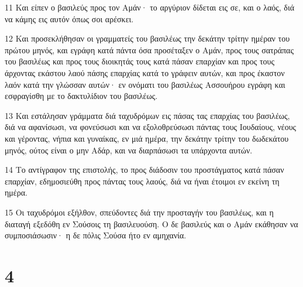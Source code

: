 \par 11 Και είπεν ο βασιλεύς προς τον Αμάν· το αργύριον δίδεται εις σε, και ο λαός, διά να κάμης εις αυτόν όπως σοι αρέσκει.
\par 12 Και προσεκλήθησαν οι γραμματείς του βασιλέως την δεκάτην τρίτην ημέραν του πρώτου μηνός, και εγράφη κατά πάντα όσα προσέταξεν ο Αμάν, προς τους σατράπας του βασιλέως και προς τους διοικητάς τους κατά πάσαν επαρχίαν και προς τους άρχοντας εκάστου λαού πάσης επαρχίας κατά το γράφειν αυτών, και προς έκαστον λαόν κατά την γλώσσαν αυτών· εν ονόματι του βασιλέως Ασσουήρου εγράφη και εσφραγίσθη με το δακτυλίδιον του βασιλέως.
\par 13 Και εστάλησαν γράμματα διά ταχυδρόμων εις πάσας τας επαρχίας του βασιλέως, διά να αφανίσωσι, να φονεύσωσι και να εξολοθρεύσωσι πάντας τους Ιουδαίους, νέους και γέροντας, νήπια και γυναίκας, εν μιά ημέρα, την δεκάτην τρίτην του δωδεκάτου μηνός, ούτος είναι ο μην Αδάρ, και να διαρπάσωσι τα υπάρχοντα αυτών.
\par 14 Το αντίγραφον της επιστολής, το προς διάδοσιν του προστάγματος κατά πάσαν επαρχίαν, εδημοσιεύθη προς πάντας τους λαούς, διά να ήναι έτοιμοι εν εκείνη τη ημέρα.
\par 15 Οι ταχυδρόμοι εξήλθον, σπεύδοντες διά την προσταγήν του βασιλέως, και η διαταγή εξεδόθη εν Σούσοις τη βασιλευούση. Ο δε βασιλεύς και ο Αμάν εκάθησαν να συμποσιάσωσιν· η δε πόλις Σούσα ήτο εν αμηχανία.

\chapter{4}

